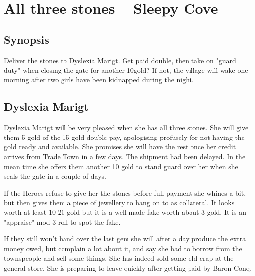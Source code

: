 \















\clearpage
\flushbottom
{}
\section*{All three stones -- Sleepy Cove}


\subsection*{Synopsis}
Deliver the stones to Dyslexia Marigt. Get paid double, then take on "guard duty" when closing the gate for another 10gold? If not, the village will wake one morning after two girls have been kidnapped during the night.


\subsection*{Dyslexia Marigt}
Dyslexia Marigt will be very pleased when she has all three stones. She will give them 5 gold of the 15 gold double pay, apologising profusely for not having the gold ready and available. She promises she will have the rest once her credit arrives from Trade Town in a few days. The shipment had been delayed.
In the mean time she offers them another 10 gold to stand guard over her when she seals the gate in a couple of days.

If the Heroes refuse to give her the stones before full payment she whines a bit, but then gives them a piece of jewellery to hang on to as collateral. It looks worth at least 10-20 gold but it is a well made fake worth about 3 gold. It is an "appraise" mod-3 roll to spot the fake.

If they still won't hand over the last gem she will after a day produce the extra money owed, but complain a lot about it, and say she had to borrow from the townspeople and sell some things. She has indeed sold some old crap at the general store. She is preparing to leave quickly after getting paid by Baron Conq.


